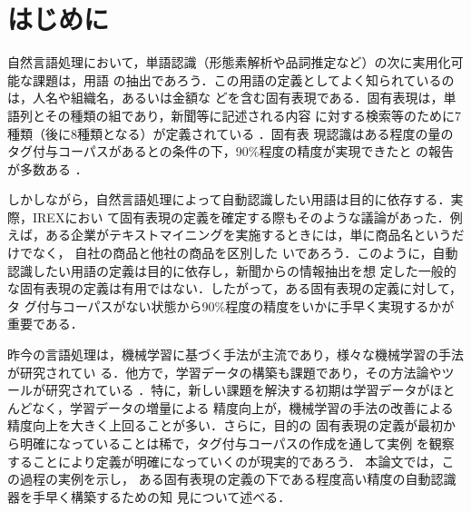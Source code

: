 \documentclass[japanese]{jnlp_1.4}
\begin{document}
\maketitle


\section{はじめに}
\label{section_intro}

自然言語処理において，単語認識（形態素解析や品詞推定など）の次に実用化可能な課題は，用語
の抽出であろう．この用語の定義としてよく知られているのは，人名や組織名，あるいは金額な
どを含む固有表現である．固有表現は，単語列とその種類の組であり，新聞等に記述される内容
に対する検索等のために7種類（後に8種類となる）が定義されている
\cite{Overview.of.MUC-7/MET-2,IREX:.IR.and.IE.Evaluation.Project.in.Japanese}．固有表
現認識はある程度の量のタグ付与コーパスがあるとの条件の下，90\%程度の精度が実現できたと
の報告が多数ある
\cite{A.Maximum.Entropy.Approach.to.Named.Entity.Recognition,Conditional.Random.Fields:.Probabilistic.Models.for.Segmenting.and.Labeling.Sequence.Data,Introduction.to.the.CoNLL-2003.Shared.Task:.Language-Independent.Named.Entity.Recognition}．

しかしながら，自然言語処理によって自動認識したい用語は目的に依存する．実際，IREXにおい
て固有表現の定義を確定する際もそのような議論があった\cite{固有表現定義の問題点}．例
えば，ある企業がテキストマイニングを実施するときには，単に商品名というだけでなく，
自社の商品と他社の商品を区別した
いであろう．このように，自動認識したい用語の定義は目的に依存し，新聞からの情報抽出を想
定した一般的な固有表現の定義は有用ではない．したがって，ある固有表現の定義に対して，タ
グ付与コーパスがない状態から90\%程度の精度をいかに手早く実現するかが重要である．

昨今の言語処理は，機械学習に基づく手法が主流であり，様々な機械学習の手法が研究されてい
る．他方で，学習データの構築も課題であり，その方法論やツールが研究されている
\cite{自然言語処理特集号}
．特に，新しい課題を解決する初期は学習データがほとんどなく，学習データの増量による
精度向上が，機械学習の手法の改善による精度向上を大きく上回ることが多い．さらに，目的の
固有表現の定義が最初から明確になっていることは稀で，タグ付与コーパスの作成を通して実例
を観察することにより定義が明確になっていくのが現実的であろう．
本論文では，この過程の実例を示し，
ある固有表現の定義の下である程度高い精度の自動認識器を手早く構築するための知
見について述べる．
\end{document}
